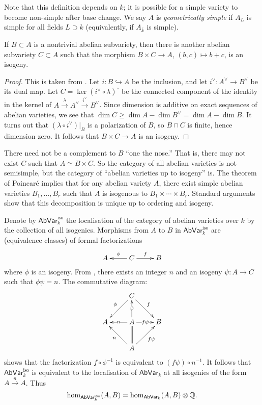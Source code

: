 \documentclass{article}
\begin{document}
Note that this definition depends on $k$; it is possible for a simple variety 
to become non-simple after base change. We say $A$ is \emph{geometrically 
simple} if $A_L$ is simple for all fields $L\supset k$ (equivalently, if 
$A_{\bar k}$ is simple). 

\begin{theorem}[Poincar\'e]
If $B\subset A$ is a nontrivial abelian subvariety, then there is another 
abelian subvariety $C\subset A$ such that the morphism $B\times C\to A$, 
$(b,c)\mapsto b+c$, is an isogeny. 
\end{theorem}
\begin{proof}
This is taken from \cite[I.10.1]{mi}. Let $i:B\hookrightarrow A$ be the 
inclusion, and let $i^\vee:A^\vee \to B^\vee$ be its dual map. Let 
$C=\ker(i^\vee\circ\lambda)^\circ$ be the connected component of the identity 
in the kernel of $A\xrightarrow\lambda A^\vee \xrightarrow{i^\vee} B^\vee$. 
Since dimension is additive on exact sequences of abelian varieties, we see 
that $\dim C\geqslant \dim A-\dim B^\vee=\dim A-\dim B$. It turns out that 
$(\lambda\circ i^\vee)|_B$ is a polarization of $B$, so $B\cap C$ is finite, 
hence dimension zero. It follows that $B\times C\to A$ is an isogeny. 
\end{proof}

There need not be a complement to $B$ ``one the nose.'' That is, there may not 
exist $C$ such that $A\simeq B\times C$. So the category of all abelian 
varieties is not semisimple, but the category of ``abelian varieties up to 
isogeny'' is. The theorem of Poincar\'e implies that for any abelian variety 
$A$, there exist simple abelian varieties $B_1,\dots,B_r$ such that $A$ is 
isogenous to $B_1\times\cdots \times B_r$. Standard arguments show that this 
decomposition is unique up to ordering and isogeny. 

Denote by $\mathsf{AbVar}_k^\mathrm{iso}$ the localisation of the category of 
abelian varieties over $k$ by the collection of all isogenies. Morphisms from 
$A$ to $B$ in $\mathsf{AbVar}_k^\mathrm{iso}$ are (equivalence classes) of 
formal factorizations 
\[\xymatrix{
  A 
    & C \ar[l]_-\phi \ar[r]^-f 
    & B
}\]
where $\phi$ is an isogeny. From \cite[V.18]{mu08}, there exists an integer $n$ 
and an isogeny $\psi:A\to C$ such that $\phi\psi=n$. The commutative diagram:
\[\xymatrix{
  & C \ar[dl]_-\phi \ar[dr]^-f \\
  A & A \ar[l]|-n \ar[u]|-\psi \ar[r]|-{f\psi} \ar@{=}[d] & B \\
  & A \ar[ul]^-n \ar[ur]_-{f\psi}
}\]
shows that the factorization $f\circ \phi^{-1}$ is equivalent to 
$(f\psi)\circ n^{-1}$. It follows that $\mathsf{AbVar}_k^\mathrm{iso}$ is 
equivalent to the localisation of $\mathsf{AbVar}_k$ at all isogenies of the 
form $A\xrightarrow n A$. Thus 
\[
  \hom_{\mathsf{AbVar}_k^\mathrm{iso}}(A,B) = \hom_{\mathsf{AbVar}_k}(A,B)\otimes\mathbb{Q} \text{.}
\]
\end{document}
